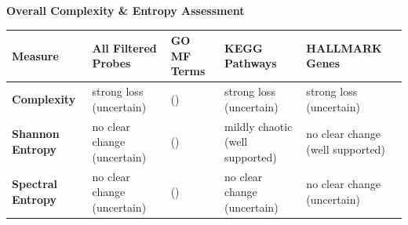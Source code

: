 \documentclass[
  letterpaper,
  DIV=11,
  numbers=noendperiod,
  openany,
  oneside]{scrreprt}
\begin{document}
\textbf{Overall Complexity \& Entropy Assessment}

\begin{longtable}[]{@{}
  >{\raggedright\arraybackslash}p{}
  >{\raggedright\arraybackslash}p{}
  >{\raggedright\arraybackslash}p{}
  >{\raggedright\arraybackslash}p{}
  >{\raggedright\arraybackslash}p{}@{}}
\toprule\noalign{}
\begin{minipage}[b]{\linewidth}\raggedright
Measure
\end{minipage} & \begin{minipage}[b]{\linewidth}\raggedright
All Filtered Probes
\end{minipage} & \begin{minipage}[b]{\linewidth}\raggedright
GO MF Terms
\end{minipage} & \begin{minipage}[b]{\linewidth}\raggedright
KEGG Pathways
\end{minipage} & \begin{minipage}[b]{\linewidth}\raggedright
HALLMARK Genes
\end{minipage} \\
\midrule\noalign{}
\endhead
\bottomrule\noalign{}
\endlastfoot
\textbf{Complexity} & strong loss (uncertain) & () & strong loss
(uncertain) & strong loss (uncertain) \\
\textbf{Shannon Entropy} & no clear change (uncertain) & () & mildly
chaotic (well supported) & no clear change (well supported) \\
\textbf{Spectral Entropy} & no clear change (uncertain) & () & no clear
change (uncertain) & no clear change (uncertain) \\
\end{longtable}
\end{document}
